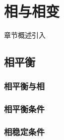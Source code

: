 \chapter{相与相变}\label{13}

章节概述引入

\section{相平衡}\label{13-1}

\subsection{相平衡与相}\label{13-1-1}

\subsection{相平衡条件}\label{13-1-2}

\subsection{相稳定条件}\label{13-1-3}